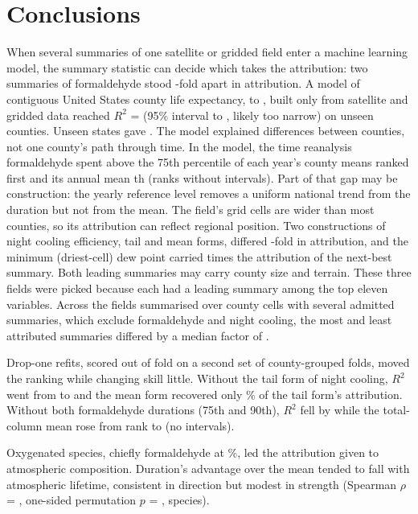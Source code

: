 \documentclass[sensors,article,submit,moreauthors,pdftex]{Definitions/mdpi}
\begin{document}
\section{Conclusions}
\label{sec:conclusions}
When several summaries of one satellite or gridded field enter a machine
learning model, the summary statistic can decide which takes the
attribution: two summaries of formaldehyde stood \HchoRatio{}-fold apart in
attribution. A model of contiguous United States county life expectancy,
\YearStart{} to \YearEnd{}, built only
from satellite and gridded data reached $R^{2}$ = \Rtwo{} (95\% interval \RtwoCIlo{} to \RtwoCIhi{}, likely too narrow) on
unseen counties. Unseen states gave \HoldStateRtwo{}. The model explained differences between counties, not one county's path through time. In the model, the time
reanalysis formaldehyde spent above the 75th percentile of each year's county
means ranked first and its annual mean \HchoConRank{}th (ranks without intervals). Part of that gap may
be construction: the yearly reference level removes a uniform national
trend from the duration but not from the mean. The field's grid cells are
wider than most counties, so its attribution can reflect regional
position.
Two constructions of night cooling efficiency, tail and mean forms,
differed \NCEratio{}-fold in attribution, and
the minimum (driest-cell) dew point carried \DPProfileRatio{} times the
attribution of
the next-best summary. Both leading summaries may carry county size and terrain. These three fields were picked because each had a leading summary
among the top eleven variables. Across the \StatFieldsTotal{} fields summarised over
county cells with several admitted summaries, which exclude formaldehyde and night cooling, the most and least attributed
summaries differed by a median factor of \CensusMedianSpread{}.

Drop-one refits, scored out of fold on a second set of county-grouped folds, moved the ranking while changing skill little. Without the
tail form of night cooling, $R^{2}$ went from \RefitFullRtwo{} to
\RefitDropRtwo{} and the mean form recovered only
\RefitRecoveredPct{}\% of the tail form's attribution. Without both
formaldehyde durations (75th and 90th), $R^{2}$ fell by \HchoDropBothCost{} while the
total-column mean rose from rank \HchoColRankWith{} to
\HchoColRankWithout{} (no intervals).

Oxygenated species, chiefly formaldehyde at \FamHchoPct{}\%, led
the attribution given to atmospheric composition. Duration's advantage over the mean tended to fall with
atmospheric lifetime, consistent in direction but modest in strength (Spearman
$\rho$ = \LtRho{}, one-sided permutation $p$ = \LtPermP{}, \LtSpecies{}
species). 
\end{document}
